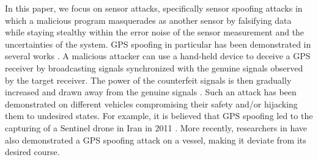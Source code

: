 \documentclass[letterpaper, 10 pt, conference]{ieeeconf}  %
\begin{document}
In this paper, we focus on sensor attacks, specifically sensor spoofing attacks in which a malicious program masquerades as another sensor by falsifying data while staying stealthy within the error noise of the sensor measurement and the uncertainties of the system. GPS spoofing in particular has been demonstrated in several works \cite{humphreys2008assessing, protecting_gps_2016, peterson_faramarzi_2011}. A malicious attacker can use a hand-held device to deceive a GPS receiver by broadcasting signals synchronized with the genuine signals observed by the target receiver. The power of the counterfeit signals is then gradually increased and drawn away from the genuine signals \cite{humphreys2008assessing}. Such an attack has been demonstrated on different vehicles compromising their safety and/or hijacking them to undesired states.
%
%
For example, it is believed that GPS spoofing led to the capturing of a Sentinel drone in Iran in 2011 \cite{peterson_faramarzi_2011}. More recently, researchers in \cite{protecting_gps_2016} have also demonstrated a GPS spoofing attack on a vessel, making it deviate from its desired course.
 
\end{document}
